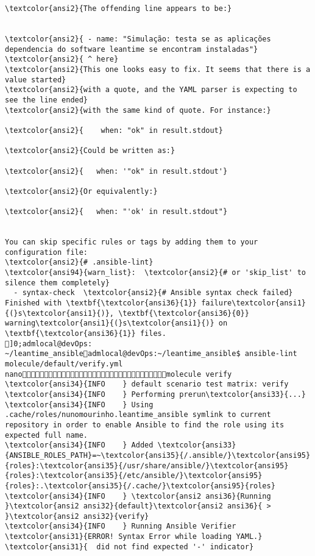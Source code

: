 \documentclass{scrartcl}
\begin{document}
\begin{Verbatim}
\textcolor{ansi2}{The offending line appears to be:}


\textcolor{ansi2}{ - name: "Simulação: testa se as aplicações dependencia do software leantime se encontram instaladas"}
\textcolor{ansi2}{ ^ here}
\textcolor{ansi2}{This one looks easy to fix. It seems that there is a value started}
\textcolor{ansi2}{with a quote, and the YAML parser is expecting to see the line ended}
\textcolor{ansi2}{with the same kind of quote. For instance:}

\textcolor{ansi2}{    when: "ok" in result.stdout}

\textcolor{ansi2}{Could be written as:}

\textcolor{ansi2}{   when: '"ok" in result.stdout'}

\textcolor{ansi2}{Or equivalently:}

\textcolor{ansi2}{   when: "'ok' in result.stdout"}


You can skip specific rules or tags by adding them to your configuration file:
\textcolor{ansi2}{# .ansible-lint}
\textcolor{ansi94}{warn_list}:  \textcolor{ansi2}{# or 'skip_list' to silence them completely}
  - syntax-check  \textcolor{ansi2}{# Ansible syntax check failed}
Finished with \textbf{\textcolor{ansi36}{1}} failure\textcolor{ansi1}{(}s\textcolor{ansi1}{)}, \textbf{\textcolor{ansi36}{0}} warning\textcolor{ansi1}{(}s\textcolor{ansi1}{)} on \textbf{\textcolor{ansi36}{1}} files.
]0;admlocal@devOps: ~/leantime_ansibleadmlocal@devOps:~/leantime_ansible$ ansible-lint molecule/default/verify.yml 
nanomolecule verify
\textcolor{ansi34}{INFO    } default scenario test matrix: verify
\textcolor{ansi34}{INFO    } Performing prerun\textcolor{ansi33}{...}
\textcolor{ansi34}{INFO    } Using .cache/roles/nunomourinho.leantime_ansible symlink to current repository in order to enable Ansible to find the role using its expected full name.
\textcolor{ansi34}{INFO    } Added \textcolor{ansi33}{ANSIBLE_ROLES_PATH}=~\textcolor{ansi35}{/.ansible/}\textcolor{ansi95}{roles}:\textcolor{ansi35}{/usr/share/ansible/}\textcolor{ansi95}{roles}:\textcolor{ansi35}{/etc/ansible/}\textcolor{ansi95}{roles}:.\textcolor{ansi35}{/.cache/}\textcolor{ansi95}{roles}
\textcolor{ansi34}{INFO    } \textcolor{ansi2 ansi36}{Running }\textcolor{ansi2 ansi32}{default}\textcolor{ansi2 ansi36}{ > }\textcolor{ansi2 ansi32}{verify}
\textcolor{ansi34}{INFO    } Running Ansible Verifier
\textcolor{ansi31}{ERROR! Syntax Error while loading YAML.}
\textcolor{ansi31}{  did not find expected '-' indicator}


\end{Verbatim}
\end{document}
